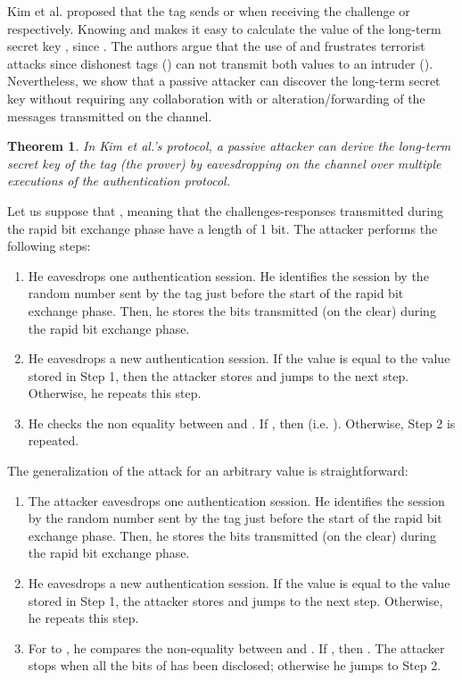 \documentclass{article}
\newtheorem{theorem}{Theorem}\newtheorem{proposition}[theorem]{Proposition}
\newenvironment{proof}[1][Proof]{\begin{trivlist}
\item[\hskip \labelsep {\bfseries #1}]}{\end{trivlist}}
\begin{document}
Kim et al. proposed that the tag sends  or   when receiving the challenge  or   respectively. Knowing  and  makes it easy to calculate the value of the long-term secret key , since  . The authors argue that the use of   and  frustrates terrorist attacks since dishonest tags () can not transmit both values to an intruder (). Nevertheless, we show that a passive attacker can discover the long-term secret key  without requiring any collaboration with  or alteration/forwarding of the messages transmitted on the channel.

\begin{theorem}
In Kim et al.'s \cite{KimAKSP-2008-icisc} protocol, a passive attacker can derive the long-term secret key of the tag (the prover) by eavesdropping on the channel over multiple executions of the authentication protocol.
\end{theorem}

\begin{proof}

Let us suppose that , meaning that the challenges-responses transmitted during the rapid bit exchange phase have a length of 1 bit. The attacker performs the following steps:
\begin{enumerate}
  \item  He eavesdrops one authentication session. He identifies the session by the random number  sent by the tag just before the start of the rapid bit exchange phase.  Then, he stores the bits  transmitted (on the clear) during the rapid bit exchange phase.
  \item  He eavesdrops a new authentication session. If the value  is equal to the value stored in Step 1, then the attacker stores  and jumps to the next step. Otherwise, he repeats this step.
  \item  He checks the non equality between  and . If , then  (i.e. ). Otherwise, Step 2 is repeated.
\end{enumerate}

The generalization of the attack for an arbitrary value  is straightforward:
\begin{enumerate}
  \item  The attacker eavesdrops one authentication session. He identifies the session by the random number  sent by the tag just before the start of the rapid bit exchange phase.  Then, he stores the bits  transmitted (on the clear) during the rapid bit exchange phase.
  \item  He eavesdrops a new authentication session. If the value  is equal to the value stored in Step 1, the attacker stores  and jumps to the next step. Otherwise, he repeats this step.
  \item  For  to , he compares the non-equality between  and . If , then .  The attacker stops when all the bits of  has been disclosed; otherwise he jumps to Step 2. \end{enumerate}

\end{proof}
\end{document}
